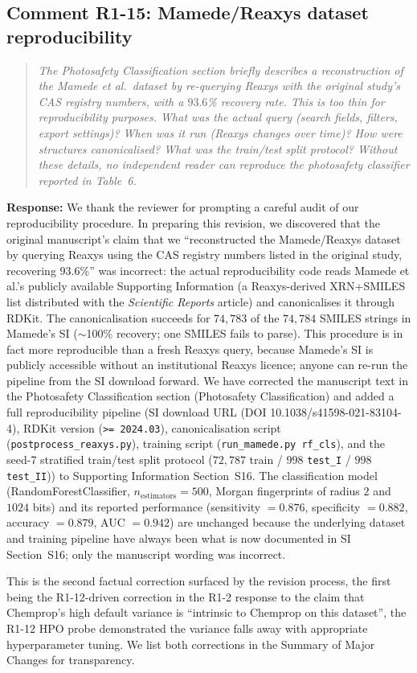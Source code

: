 \documentclass[11pt]{article}
\newenvironment{reviewer}{%
  \begin{quote}\itshape\color{black!70}}{%
  \end{quote}}
\newcommand{\response}[1]{\noindent\textbf{Response:} #1\par\medskip}
\begin{document}
\subsection*{Comment R1-15: Mamede/Reaxys dataset reproducibility}
\begin{reviewer}
The Photosafety Classification section briefly describes a reconstruction of the Mamede et al.\ dataset by re-querying Reaxys with the original study's CAS registry numbers, with a $93.6$\% recovery rate. This is too thin for reproducibility purposes. What was the actual query (search fields, filters, export settings)? When was it run (Reaxys changes over time)? How were structures canonicalised? What was the train/test split protocol? Without these details, no independent reader can reproduce the photosafety classifier reported in Table~6.
\end{reviewer}

\response{We thank the reviewer for prompting a careful audit of our reproducibility procedure. In preparing this revision, we discovered that the original manuscript's claim that we ``reconstructed the Mamede/Reaxys dataset by querying Reaxys using the CAS registry numbers listed in the original study, recovering $93.6$\%'' was incorrect: the actual reproducibility code reads Mamede et al.'s publicly available Supporting Information (a Reaxys-derived XRN+SMILES list distributed with the \emph{Scientific Reports} article) and canonicalises it through RDKit. The canonicalisation succeeds for $74{,}783$ of the $74{,}784$ SMILES strings in Mamede's SI ($\sim$100\% recovery; one SMILES fails to parse). This procedure is in fact more reproducible than a fresh Reaxys query, because Mamede's SI is publicly accessible without an institutional Reaxys licence; anyone can re-run the pipeline from the SI download forward. We have corrected the manuscript text in the Photosafety Classification section (Photosafety Classification) and added a full reproducibility pipeline (SI download URL (DOI 10.1038/s41598-021-83104-4), RDKit version (\texttt{>= 2024.03}), canonicalisation script (\texttt{postprocess\_reaxys.py}), training script (\texttt{run\_mamede.py rf\_cls}), and the seed-7 stratified train/test split protocol ($72{,}787$ train / $998$ \texttt{test\_I} / $998$ \texttt{test\_II})) to Supporting Information Section~S16. The classification model (RandomForestClassifier, $n_{\text{estimators}} = 500$, Morgan fingerprints of radius $2$ and $1024$ bits) and its reported performance (sensitivity $= 0.876$, specificity $= 0.882$, accuracy $= 0.879$, AUC $= 0.942$) are unchanged because the underlying dataset and training pipeline have always been what is now documented in SI Section~S16; only the manuscript wording was incorrect.

This is the second factual correction surfaced by the revision process, the first being the R1-12-driven correction in the R1-2 response to the claim that Chemprop's high default variance is ``intrinsic to Chemprop on this dataset'', the R1-12 HPO probe demonstrated the variance falls away with appropriate hyperparameter tuning. We list both corrections in the Summary of Major Changes for transparency.}
\end{document}
